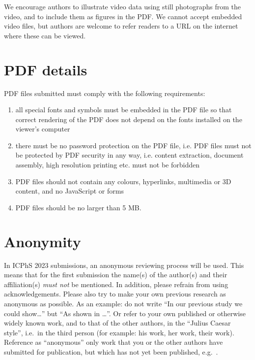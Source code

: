 \documentclass[
  a4paper,
  11pt,
  twocolumn]{article}
\begin{document}
We encourage authors to illustrate video data using still photographs
from the video, and to include them as figures in the PDF. We cannot
accept embedded video files, but authors are welcome to refer readers to
a URL on the internet where these can be viewed.

\section{PDF details}

PDF files submitted must comply with the following requirements:

\begin{enumerate}
\item all special fonts and symbols must be embedded in the PDF
  file so that correct rendering of the PDF does not depend on the
  fonts installed on the viewer's computer
\item there must be no
  password protection on the PDF file, i.e. PDF files must not be
  protected by PDF security in any way, i.e. content extraction,
  document assembly, high resolution printing etc. must not be
  forbidden
\item PDF files should not contain any colours, hyperlinks,
  multimedia or 3D content, and no JavaScript or forms
\item PDF files
  should be no larger than 5 MB.
\end{enumerate}

\section{Anonymity}

In ICPhS 2023 submissions, an anonymous reviewing process will be used.
This means that for the first submission the name(s) of the author(s)
and their affiliation(s) \emph{must not} be mentioned. In addition,
please refrain from using acknowledgements. Please also try to make your
own previous research as anonymous as possible. As an example: do not
write ``In our previous study \cite{Stevens:1999} we could show\ldots''
but ``As shown in \cite{Stevens:1999}\ldots''. Or refer to your own
published or otherwise widely known work, and to that of the other
authors, in the ``Julius Caesar style'', i.e.~in the third person (for
example: his work, her work, their work). Reference as ``anonymous''
only work that you or the other authors have submitted for publication,
but which has not yet been published, e.g.~\cite{Anonymous:submitted}.
\end{document}

